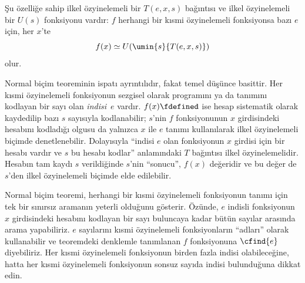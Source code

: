 \documentclass[../../../include/open-logic-section]{subfiles}
\begin{document}

\begin{thm}
Şu özelliğe sahip ilkel özyinelemeli bir $T(e,x,s)$ bağıntısı ve ilkel
özyinelemeli bir $U(s)$ fonksiyonu vardır: $f$ herhangi bir kısmi
özyinelemeli fonksiyonsa bazı $e$ için, her $x$'te
\[
  f(x)\simeq U(\umin{s}{T(e,x,s)})
\]
olur.
\end{thm}

\begin{explain}
Normal biçim teoreminin ispatı ayrıntılıdır, fakat temel düşünce basittir.
Her kısmi özyinelemeli fonksiyonun sezgisel olarak programını ya da tanımını
kodlayan bir sayı olan \emph{indisi}~$e$ vardır. $f(x)\fdefined$ ise hesap
sistematik olarak kaydedilip bazı $s$ sayısıyla kodlanabilir; $s$'nin
$f$ fonksiyonunun $x$ girdisindeki hesabını kodladığı olgusu da yalnızca
$x$ ile $e$ tanımı kullanılarak ilkel özyinelemeli biçimde denetlenebilir.
Dolayısıyla ``indisi $e$ olan fonksiyonun $x$ girdisi için bir hesabı vardır
ve $s$ bu hesabı kodlar'' anlamındaki $T$ bağıntısı ilkel özyinelemelidir.
Hesabın tam kaydı $s$ verildiğinde $s$'nin ``sonucu'', $f(x)$ değeridir ve bu
değer de $s$'den ilkel özyinelemeli biçimde elde edilebilir.

Normal biçim teoremi, herhangi bir kısmi özyinelemeli fonksiyonun tanımı için
tek bir sınırsız aramanın yeterli olduğunu gösterir. Özünde, $e$ indisli
fonksiyonun $x$ girdisindeki hesabını kodlayan bir sayı buluncaya kadar bütün
sayılar arasında arama yapabiliriz. $e$ sayılarını kısmi özyinelemeli
fonksiyonların ``adları'' olarak kullanabilir ve teoremdeki denklemle
tanımlanan $f$ fonksiyonuna $\cfind{e}$ diyebiliriz. Her kısmi özyinelemeli
fonksiyonun birden fazla indisi olabileceğine, hatta her kısmi özyinelemeli
fonksiyonun sonsuz sayıda indisi bulunduğuna dikkat edin.
\end{explain}
\end{document}
